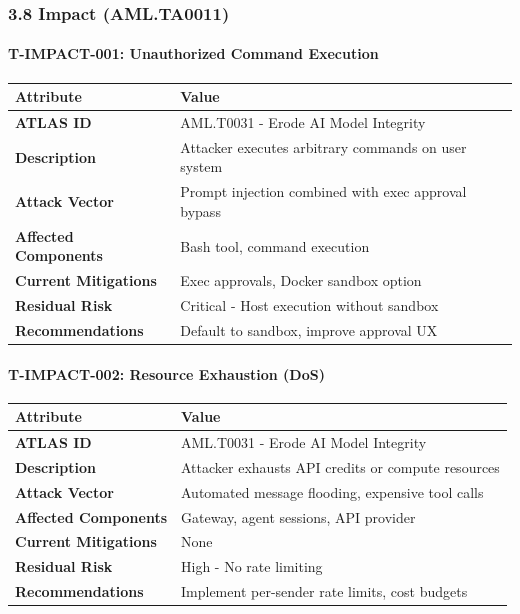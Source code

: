 \hrulefill


\subsubsection{3.8 Impact (AML.TA0011)}


\paragraph{T-IMPACT-001: Unauthorized Command Execution}



\begin{table}[h]
\centering
\small
\begin{tabular}{|l|l|}
\hline
Attribute & Value \\
\hline
\textbf{ATLAS ID} & AML.T0031 - Erode AI Model Integrity \\
\hline
\textbf{Description} & Attacker executes arbitrary commands on user system \\
\hline
\textbf{Attack Vector} & Prompt injection combined with exec approval bypass \\
\hline
\textbf{Affected Components} & Bash tool, command execution \\
\hline
\textbf{Current Mitigations} & Exec approvals, Docker sandbox option \\
\hline
\textbf{Residual Risk} & Critical - Host execution without sandbox \\
\hline
\textbf{Recommendations} & Default to sandbox, improve approval UX \\
\hline
\end{tabular}
\end{table}



\paragraph{T-IMPACT-002: Resource Exhaustion (DoS)}



\begin{table}[h]
\centering
\small
\begin{tabular}{|l|l|}
\hline
Attribute & Value \\
\hline
\textbf{ATLAS ID} & AML.T0031 - Erode AI Model Integrity \\
\hline
\textbf{Description} & Attacker exhausts API credits or compute resources \\
\hline
\textbf{Attack Vector} & Automated message flooding, expensive tool calls \\
\hline
\textbf{Affected Components} & Gateway, agent sessions, API provider \\
\hline
\textbf{Current Mitigations} & None \\
\hline
\textbf{Residual Risk} & High - No rate limiting \\
\hline
\textbf{Recommendations} & Implement per-sender rate limits, cost budgets \\
\hline
\end{tabular}
\end{table}



